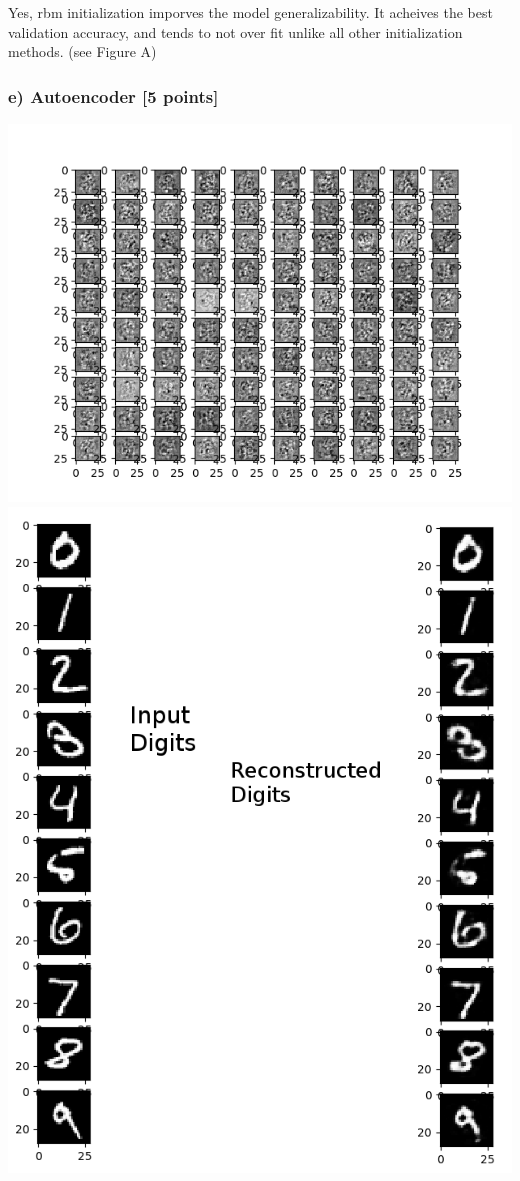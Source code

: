 \documentclass[10pt]{article}
\begin{document}
Yes, rbm initialization imporves the model generalizability. It acheives the best validation accuracy, and tends to not over fit unlike all other initialization methods. (see Figure A)

\subsubsection*{e) Autoencoder [5 points]}

\includegraphics[scale=0.6]{ae_weights.png}
\includegraphics[scale=0.3]{ae_recon.png}
\end{document}
